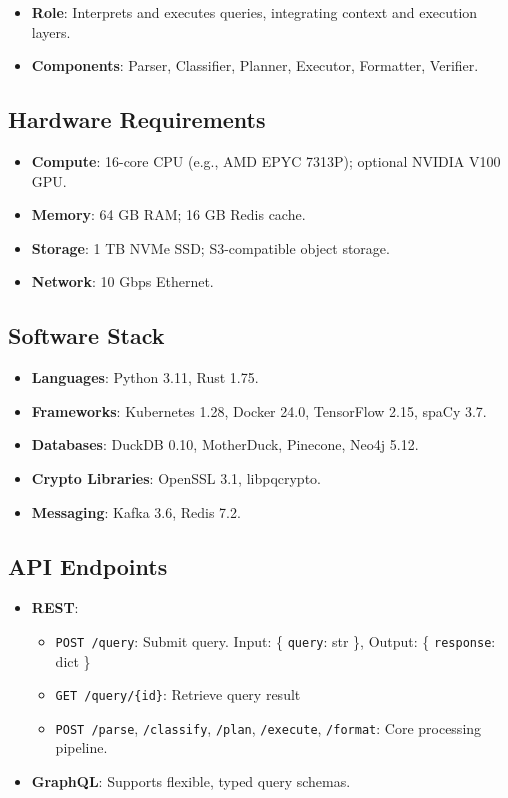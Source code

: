 \documentclass[11pt]{article}
\begin{document}
\begin{itemize}
    \item \textbf{Role}: Interprets and executes queries, integrating context and execution layers.
    \item \textbf{Components}: Parser, Classifier, Planner, Executor, Formatter, Verifier.
\end{itemize}

\subsection{Hardware Requirements}

\begin{itemize}
    \item \textbf{Compute}: 16-core CPU (e.g., AMD EPYC 7313P); optional NVIDIA V100 GPU.
    \item \textbf{Memory}: 64 GB RAM; 16 GB Redis cache.
    \item \textbf{Storage}: 1 TB NVMe SSD; S3-compatible object storage.
    \item \textbf{Network}: 10 Gbps Ethernet.
\end{itemize}

\subsection{Software Stack}

\begin{itemize}
    \item \textbf{Languages}: Python 3.11, Rust 1.75.
    \item \textbf{Frameworks}: Kubernetes 1.28, Docker 24.0, TensorFlow 2.15, spaCy 3.7.
    \item \textbf{Databases}: DuckDB 0.10, MotherDuck, Pinecone, Neo4j 5.12.
    \item \textbf{Crypto Libraries}: OpenSSL 3.1, libpqcrypto.
    \item \textbf{Messaging}: Kafka 3.6, Redis 7.2.
\end{itemize}

\subsection{API Endpoints}

\begin{itemize}
    \item \textbf{REST}:
        \begin{itemize}
            \item \texttt{POST /query}: Submit query. Input: \{ \texttt{query}: str \}, Output: \{ \texttt{response}: dict \}
            \item \texttt{GET /query/\{id\}}: Retrieve query result
            \item \texttt{POST /parse}, \texttt{/classify}, \texttt{/plan}, \texttt{/execute}, \texttt{/format}: Core processing pipeline.
        \end{itemize}
    \item \textbf{GraphQL}: Supports flexible, typed query schemas.
\end{itemize}
\end{document}

